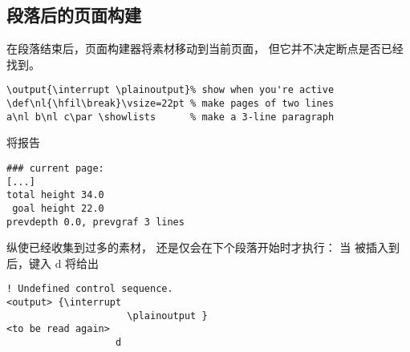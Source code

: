 \documentclass{book}
\begin{document}
\subsection{段落后的页面构建}
\label{par:page:build}

在段落结束后，页面构建器将素材移动到当前页面，
但它并不决定断点是否已经找到。

\begin{example}
\begin{verbatim}
\output{\interrupt \plainoutput}% show when you're active
\def\nl{\hfil\break}\vsize=22pt % make pages of two lines
a\nl b\nl c\par \showlists      % make a 3-line paragraph
\end{verbatim}
将报告
\begin{verbatim}
### current page:
[...]
total height 34.0
 goal height 22.0
prevdepth 0.0, prevgraf 3 lines
\end{verbatim}
纵使已经收集到过多的素材， 还是仅会在下个段落开始时才执行：
当  被插入到  后，键入 \n d 将给出
\begin{verbatim}
! Undefined control sequence.
<output> {\interrupt 
                     \plainoutput }
<to be read again> 
                   d
\end{verbatim}
\end{example}


\endofchapter
\end{document}
